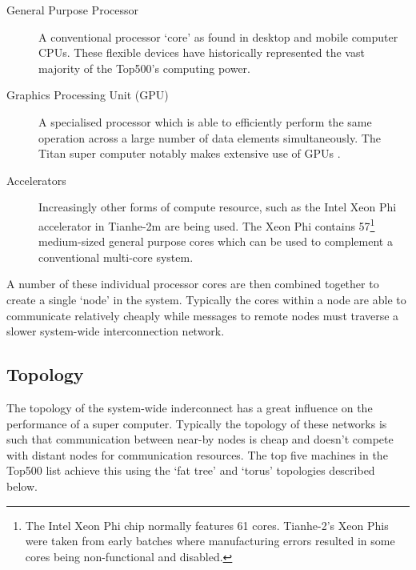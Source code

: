 			\begin{description}
				
				\item[General Purpose Processor] A conventional processor `core' as
				found in desktop and mobile computer CPUs. These flexible devices have
				historically represented the vast majority of the Top500's computing
				power.
				
				\item[Graphics Processing Unit (GPU)] A specialised processor which is
				able to efficiently perform the same operation across a large number of
				data elements simultaneously. The Titan super computer notably makes
				extensive use of GPUs \cite{bland12}.
				
				\item[Accelerators] Increasingly other forms of compute resource, such
				as the Intel Xeon Phi accelerator in Tianhe-2m are being used. The Xeon
				Phi contains 57\footnote{The Intel Xeon Phi chip normally features 61
				cores.  Tianhe-2's Xeon Phis were taken from early batches where
				manufacturing errors resulted in some cores being non-functional and
				disabled.} medium-sized general purpose cores which can be used to
				complement a conventional multi-core system\cite{dongarra13}.
				
			\end{description}
			
			A number of these individual processor cores are then combined together to
			create a single `node' in the system. Typically the cores within a node
			are able to communicate relatively cheaply while messages to remote nodes
			must traverse a slower system-wide interconnection network.
			
		
		\subsection{Topology}
			
			
			The topology of the system-wide inderconnect has a great influence on the
			performance of a super computer. Typically the topology of these networks
			is such that communication between near-by nodes is cheap and doesn't
			compete with distant nodes for communication resources. The top five
			machines in the Top500 list achieve this using the `fat tree' and `torus'
			topologies described below.
			
